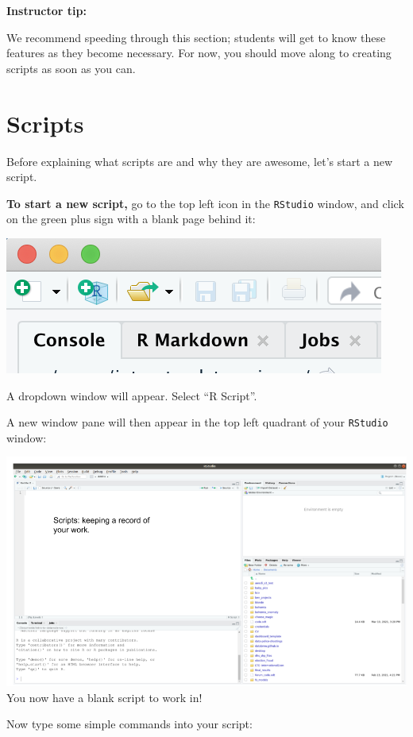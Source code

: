 \documentclass[
]{book}
\begin{document}
\leavevmode{}%
\textbf{Instructor tip:}

We recommend speeding through this section; students will get to know these features as they become necessary. For now, you should move along to creating scripts as soon as you can.

\hypertarget{scripts}{%
\section*{Scripts}\label{scripts}}

Before explaining what scripts are and why they are awesome, let's start a new script.

\textbf{To start a new script,} go to the top left icon in the \texttt{RStudio} window, and click on the green plus sign with a blank page behind it:

\includegraphics{img/rstudio_newscript.png}

A dropdown window will appear. Select ``R Script''.

A new window pane will then appear in the top left quadrant of your \texttt{RStudio} window:

\includegraphics{img/rstudio_scripts.png}
You now have a blank script to work in!

Now type some simple commands into your script:
\end{document}
